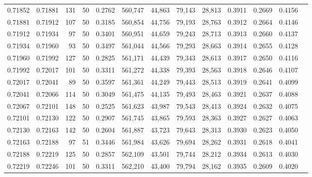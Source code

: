 \begin{tabular}{rrrrrrrrrrrrr}
0.71852 & 0.71881 &   131 &  50 &                                     0.2762 & 560,747 &  44,863 &  79,143 &  28,813 & 0.3911 & 0.2669 & 0.4156 \\
0.71881 & 0.71912 &   107 &  50 &                                     0.3185 & 560,854 &  44,756 &  79,193 &  28,763 & 0.3912 & 0.2664 & 0.4146 \\
0.71912 & 0.71934 &    97 &  50 &                                     0.3401 & 560,951 &  44,659 &  79,243 &  28,713 & 0.3913 & 0.2660 & 0.4137 \\
0.71934 & 0.71960 &    93 &  50 &                                     0.3497 & 561,044 &  44,566 &  79,293 &  28,663 & 0.3914 & 0.2655 & 0.4128 \\
0.71960 & 0.71992 &   127 &  50 &                                     0.2825 & 561,171 &  44,439 &  79,343 &  28,613 & 0.3917 & 0.2650 & 0.4116 \\
0.71992 & 0.72017 &   101 &  50 &                                     0.3311 & 561,272 &  44,338 &  79,393 &  28,563 & 0.3918 & 0.2646 & 0.4107 \\
0.72017 & 0.72041 &    89 &  50 &                                     0.3597 & 561,361 &  44,249 &  79,443 &  28,513 & 0.3919 & 0.2641 & 0.4099 \\
0.72041 & 0.72066 &   114 &  50 &                                     0.3049 & 561,475 &  44,135 &  79,493 &  28,463 & 0.3921 & 0.2637 & 0.4088 \\
0.72067 & 0.72101 &   148 &  50 &                                     0.2525 & 561,623 &  43,987 &  79,543 &  28,413 & 0.3924 & 0.2632 & 0.4075 \\
0.72101 & 0.72130 &   122 &  50 &                                     0.2907 & 561,745 &  43,865 &  79,593 &  28,363 & 0.3927 & 0.2627 & 0.4063 \\
0.72130 & 0.72163 &   142 &  50 &                                     0.2604 & 561,887 &  43,723 &  79,643 &  28,313 & 0.3930 & 0.2623 & 0.4050 \\
0.72163 & 0.72188 &    97 &  51 &                                     0.3446 & 561,984 &  43,626 &  79,694 &  28,262 & 0.3931 & 0.2618 & 0.4041 \\
0.72188 & 0.72219 &   125 &  50 &                                     0.2857 & 562,109 &  43,501 &  79,744 &  28,212 & 0.3934 & 0.2613 & 0.4030 \\
0.72219 & 0.72246 &   101 &  50 &                                     0.3311 & 562,210 &  43,400 &  79,794 &  28,162 & 0.3935 & 0.2609 & 0.4020 \\

\end{tabular}
